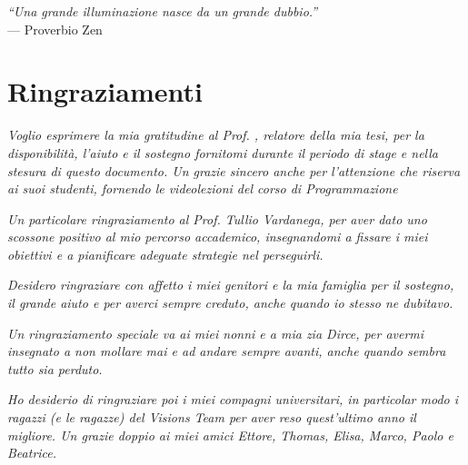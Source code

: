 
\cleardoublepage
{}
{}

\begin{flushright}{
	\slshape    
	``Una grande illuminazione nasce da un grande dubbio.''} \\ 
	\medskip
    --- Proverbio Zen
\end{flushright}


\bigskip

\begingroup
\let\clearpage\relax
\let\cleardoublepage\relax
\let\cleardoublepage\relax

\chapter*{Ringraziamenti}

\noindent \textit{Voglio esprimere la mia gratitudine al Prof. \myProf, relatore della mia tesi, per la disponibilità, l'aiuto e il sostegno fornitomi durante il periodo di stage e nella stesura di questo documento. Un grazie sincero anche per l'attenzione che riserva ai suoi studenti, fornendo le videolezioni del corso di Programmazione}\\
\bigskip

\noindent \textit{Un particolare ringraziamento al Prof. Tullio Vardanega, per aver dato uno scossone positivo al mio percorso accademico, insegnandomi a fissare i miei obiettivi e a pianificare adeguate strategie nel perseguirli.}\\
\bigskip

\noindent \textit{Desidero ringraziare con affetto i miei genitori e la mia famiglia per il sostegno, il grande aiuto e per averci sempre creduto, anche quando io stesso ne dubitavo.}\\
\bigskip

\noindent \textit{Un ringraziamento speciale va ai miei nonni e a mia zia Dirce, per avermi insegnato a non mollare mai e ad andare sempre avanti, anche quando sembra tutto sia perduto.}\\
\bigskip

\noindent \textit{Ho desiderio di ringraziare poi i miei compagni universitari, in particolar modo i ragazzi (e le ragazze) del Visions Team per aver reso quest'ultimo anno il migliore. Un grazie doppio ai miei amici Ettore, Thomas, Elisa, Marco, Paolo e Beatrice.}\\
\bigskip

